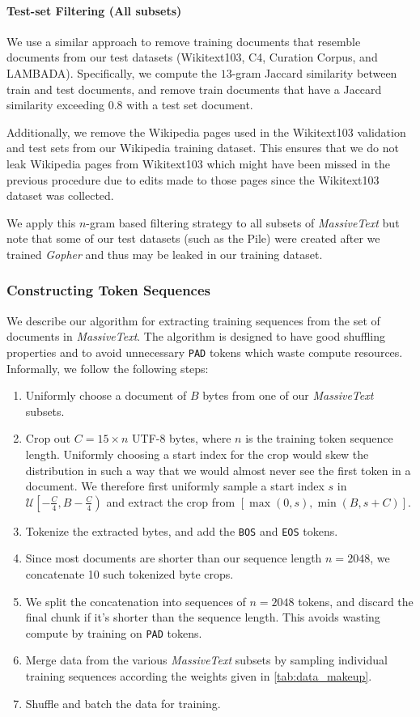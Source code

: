 \documentclass[11pt, a4paper, logo, internal, copyright, nonumbering]{deepmind}
\newcommand{\massivetext}{\textit{MassiveText}\xspace}
\newcommand{\gopher}{\textit{Gopher}\xspace}
\begin{document}
\paragraph{Test-set Filtering (All subsets)}
\label{app:test_set_filtering}
We use a similar approach to remove training documents that resemble documents from our test datasets (Wikitext103, C4, Curation Corpus, and LAMBADA). Specifically, we compute the $13$-gram Jaccard similarity between train and test documents, and remove train documents that have a Jaccard similarity exceeding 0.8 with a test set document.

Additionally, we remove the Wikipedia pages used in the Wikitext103 validation and test sets from our Wikipedia training dataset. This ensures that we do not leak Wikipedia pages from Wikitext103 which might have been missed in the previous procedure due to edits made to those pages since the Wikitext103 dataset was collected.

We apply this $n$-gram based filtering strategy to all subsets of \massivetext but note that some of our test datasets (such as the Pile) were created after we trained \gopher and thus may be leaked in our training dataset.

\subsubsection{Constructing Token Sequences}
We describe our algorithm for extracting training sequences from the set of documents in \massivetext. The algorithm is designed to have good shuffling properties and to avoid unnecessary \texttt{PAD} tokens which waste compute resources. Informally, we follow the following steps:

\begin{enumerate}
    \item Uniformly choose a document of $B$ bytes from one of our \massivetext subsets.
    \item Crop out $C{=}15 \times n$ UTF-8 bytes, where $n$ is the training token sequence length. Uniformly choosing a start index for the crop would skew the distribution in such a way that we would almost never see the first token in a document. We therefore first uniformly sample a start index $s$ in $\mathcal{U}\left[ -\frac{C}{4}, B - \frac{C}{4} \right)$ and extract the crop from $[\max(0, s), \min(B, s+C)]$.
    \item Tokenize the extracted bytes, and add the \texttt{BOS} and \texttt{EOS} tokens.
    \item Since most documents are shorter than our sequence length $n{=}2048$, we concatenate 10 such tokenized byte crops.
    \item We split the concatenation into sequences of $n{=}2048$ tokens, and discard the final chunk if it's shorter than the sequence length. This avoids wasting compute by training on \texttt{PAD} tokens.
    \item Merge data from the various \massivetext subsets by sampling individual training sequences according the weights given in \autoref{tab:data_makeup}.
    \item Shuffle and batch the data for training.
\end{enumerate}
\end{document}
